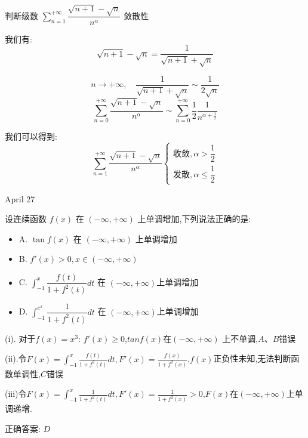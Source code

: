 \begin{example}[][Exam: 30.4.10]
	判断级数 $\sum\limits_{n=1}^{+\infty}\dfrac{\sqrt{n+1}-\sqrt{n}}{n^{\alpha}}$ 敛散性
\end{example} 

\begin{solution}
	我们有: 
	$$\sqrt{n+1}-\sqrt{n}=\dfrac{1}{\sqrt{n+1}+\sqrt{n}}$$
	
	$$n\to  +\infty,\quad \frac{1}{\sqrt{n+1}+\sqrt{n}}\sim\frac{1}{2\sqrt{n}}$$
	$$\sum\limits_{n=0}^{+\infty}\frac{\sqrt{n+1}-\sqrt{n}}{n^{\alpha}}\sim\sum\limits_{n=0}^{+\infty}\frac{1}{2}\frac{1}{n^{\alpha+\frac{1}{2}}}$$
	
	我们可以得到: 
	$$\sum\limits_{n=1}^{+\infty}\frac{\sqrt{n+1}-\sqrt{n}}{n^{\alpha}}\left\lbrace 
	\begin{array}{l}
		\text{收敛},\alpha>\dfrac{1}{2}\\
		\text{发散},\alpha \leq \dfrac{1}{2}
	\end{array}
	\right. $$
\end{solution}


\textcolor{purplea}{April 27}

\begin{example}[][Exam: 30.4.11]
	设连续函数 $f(x)$ 在 $(-\infty,+\infty)$ 上单调增加,下列说法正确的是: 
\begin{itemize}
	\item A. $\tan f(x)$ 在 $(-\infty,+\infty)$ 上单调增加
	\item B. $f'(x)>0, x\in(-\infty,+\infty)$
	\item C. $\int_{-1}^{x}\dfrac{f(t)}{1+f^{2}(t)}dt$ 在 $(-\infty,+\infty)$上单调增加
	\item D. $\int_{-1}^{e^x}\dfrac{1}{1+f^{2}(t)}dt$ 在 $(-\infty,+\infty)$上单调增加
\end{itemize}
\end{example}

\begin{solution}
	
(i). 对于$f(x)=x^3$: $f'(x)\geq 0$,$tan f(x)$在$(-\infty,+\infty)$ 上不单调,$A\text{、}B$错误
	
(ii).令$F(x)=\int_{-1}^{x}\frac{f(t)}{1+f^{2}(t)}dt,F'(x)=\frac{f(x)}{1+f^{2}(x)}$,$f(x)$正负性未知,无法判断函数单调性,$C$错误
	
(iii)令$F(x)=\int_{-1}^{x}\frac{1}{1+f^{2}(t)}dt,F'(x)=\frac{1}{1+f^{2}(x)}>0$,$F(x)$在$(-\infty,+\infty)$上单调递增.
	
正确答案: $D$
\end{solution}

